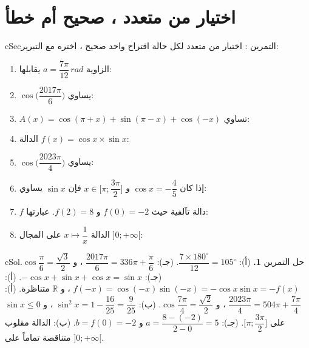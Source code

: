 \documentclass[12pt,a4paper]{article}
\newenvironment{BOX}[2]{\begin{otherlanguage}{english}\begin{arbox}{#1}{#2}}{\end{arbox}\end{otherlanguage}}
\newcounter{exo}
\newenvironment{tamrin}[1]{\stepcounter{exo}\begin{BOX}{cSec}{التمرين \theexo: #1}}{\end{BOX}}
\newenvironment{hal}{\Needspace{12\baselineskip}\begin{otherlanguage}{english}\begin{arbox}[breakable]{cSol}{حل التمرين \theexo}}{\end{arbox}\end{otherlanguage}}
\newcommand{\R}{\mathbb{R}}
\begin{document}
\section{اختيار من متعدد ، صحيح أم خطأ}
\begin{tamrin}{اختيار من متعدد}
لكل حالة اقتراح واحد صحيح ، اختره مع التبرير:
\begin{enumerate}
\item الزاوية $a=\dfrac{7\pi}{12}\,rad$ يقابلها:
\item $\cos\Big(\dfrac{2017\pi}6\Big)$ يساوي:
\item $A(x)=\cos(\pi+x)+\sin(\pi-x)+\cos(-x)$ تساوي:
\item الدالة $f(x)=\cos x\times\sin x$:
\item $\cos\Big(\dfrac{2023\pi}4\Big)$ يساوي:
\item إذا كان $\cos x=-\dfrac45$ و $x\in\Big[\pi;\dfrac{3\pi}2\Big]$ فإن $\sin x$ يساوي:
\item $f$ دالة تآلفية حيث $f(0)=-2$ و $f(2)=8$. عبارتها:
\item الدالة $x\mapsto\dfrac1x$ على المجال $]0;+\infty[$:
\end{enumerate}
\end{tamrin}
\begin{hal}
\textbf{1.} (أ): $\dfrac{7\times180^\circ}{12}=105^\circ$.
 (جـ): $\dfrac{2017\pi}6=336\pi+\dfrac\pi6$ ، و $\cos\dfrac\pi6=\dfrac{\sqrt3}2$.
 (جـ): $-\cos x+\sin x+\cos x=\sin x$.
 (أ): $f(-x)=\cos(-x)\sin(-x)=-\cos x\sin x=-f(x)$ ، و $\R$ متناظرة.
 (أ): $\dfrac{2023\pi}4=504\pi+\dfrac{7\pi}4$ ، و $\cos\dfrac{7\pi}4=\dfrac{\sqrt2}2$.
 (ب): $\sin^2x=1-\dfrac{16}{25}=\dfrac9{25}$ ، و $\sin x\le0$ على $\Big[\pi;\dfrac{3\pi}2\Big]$.
 (جـ): $a=\dfrac{8-(-2)}{2-0}=5$ و $b=f(0)=-2$.
 (ب): الدالة مقلوب متناقصة تماماً على $]0;+\infty[$.
\end{hal}
\end{document}
